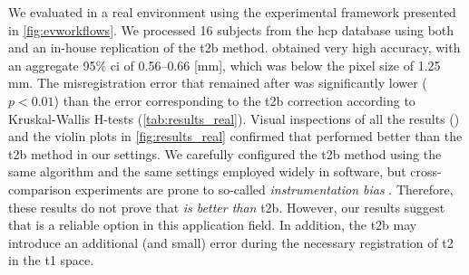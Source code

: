 We evaluated \regseg{} in a real environment using the experimental framework presented
  in \autoref{fig:evworkflows}.
We processed 16 subjects from the \gls*{hcp} database using both \regseg{}
  and an in-house replication of the \acrfull*{t2b} method.
\Regseg{} obtained very high accuracy, with an aggregate 95\% \gls*{ci} of 0.56--0.66 [mm], which was
  below the pixel size of 1.25 mm.
The misregistration error that remained after \regseg{} was significantly lower ($p < 0.01$) than the
  error corresponding to the \gls*{t2b} correction according to Kruskal-Wallis H-tests
  (\autoref{tab:results_real}).
Visual inspections of all the results () and the violin plots in
  \autoref{fig:results_real} confirmed that \regseg{} performed better than the \gls*{t2b} method
  in our settings.
We carefully configured the \gls*{t2b} method using the same algorithm and the 
  same settings employed widely in software, but cross-comparison experiments are prone to
  so-called \emph{instrumentation bias} \citep{tustison_instrumentation_2013}.
Therefore, these results do not prove that \regseg{} \emph{is better than} \gls*{t2b}.
However, our results suggest that \regseg{} is a reliable option in this application field.
In addition, the \gls*{t2b} may introduce an additional (and small) error during the necessary
  registration of \gls*{t2} in the \gls*{t1} space.

